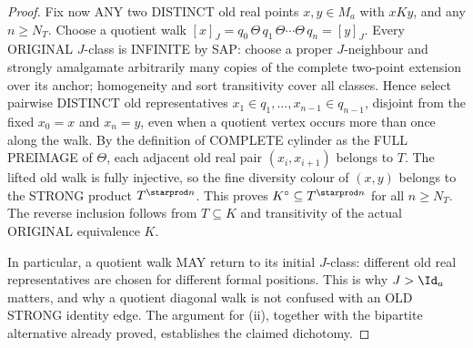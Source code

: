 \begin{proof}
Fix now ANY two DISTINCT old real points
$x,y\in M_a$ with $xKy$, and any $n\ge N_T$.
Choose a quotient walk
$[x]_J=q_0\,\Theta\,q_1\,\Theta\cdots
        \Theta\,q_n=[y]_J$.
Every ORIGINAL $J$-class is INFINITE by SAP:
choose a proper $J$-neighbour and strongly
amalgamate arbitrarily many copies of the
complete two-point extension over its anchor;
homogeneity and sort transitivity cover all
classes. Hence select pairwise DISTINCT old
representatives $x_1\in q_1,\ldots,
x_{n-1}\in q_{n-1}$, disjoint from the fixed
$x_0=x$ and $x_n=y$, even when a quotient
vertex occurs more than once along the walk.
By the definition of COMPLETE cylinder as
the FULL PREIMAGE of $\Theta$, each adjacent
old real pair $(x_i,x_{i+1})$ belongs to $T$.
The lifted old walk is fully injective, so
the fine diversity colour of $(x,y)$ belongs
to the STRONG product $T^{\starprod n}$.
This proves $K^\circ\subseteq
T^{\starprod n}$ for all $n\ge N_T$.
The reverse inclusion follows from
$T\subseteq K$ and transitivity of the
actual ORIGINAL equivalence $K$.

In particular, a quotient walk MAY return to
its initial $J$-class: different old real
representatives are chosen for different formal
positions. This is why $J>\Id_a$ matters,
and why a quotient diagonal walk is not
confused with an OLD STRONG identity edge.
The argument for (ii), together with the
bipartite alternative already proved,
establishes the claimed dichotomy.
\end{proof}

